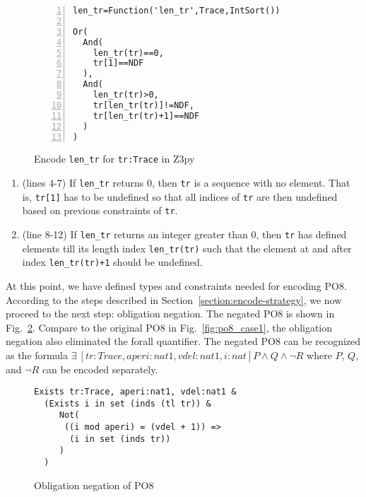 \begin{figure}[t]
\begin{center}
\begin{mdframed}[roundcorner=5pt,shadow=true]
\begin{Verbatim}[fontsize=\small,numbers=left]
len_tr=Function('len_tr',Trace,IntSort())

Or(
  And(
    len_tr(tr)==0,
    tr[1]==NDF
  ),
  And(
    len_tr(tr)>0,
    tr[len_tr(tr)]!=NDF,
    tr[len_tr(tr)+1]==NDF
  )
)
\end{Verbatim}
\end{mdframed}
\vspace{-10pt}
\caption{Encode {\tt len\_tr} for {\tt tr:Trace} in Z3py}
\label{fig:tr_len_case1}
\end{center}
\end{figure}

\begin{enumerate}
\item
(lines 4-7) If {\tt len\_tr} returns 0, then {\tt tr} is a sequence with no element. That is, {\tt tr[1]} has to be undefined so that all indices of {\tt tr} are then undefined based on previous constraints of {\tt tr}. 
\item
(line 8-12) If {\tt len\_tr} returns an integer greater than 0, then {\tt tr} has defined elements till its length index {\tt len\_tr(tr)} such that the element at and after index {\tt len\_tr(tr)+1} should be undefined. 
\end{enumerate}

At this point, we have defined types and constraints needed for encoding PO8. According to the steps described in Section~\ref{section:encode-strategy}, we now proceed to the next step: obligation negation. The negated PO8 is shown in Fig.~\ref{fig:po8_negation_case1}. Compare to the original PO8 in Fig.~\ref{fig:po8_case1}, the obligation negation also eliminated the forall quantifier. The negated PO8 can be recognized as the formula $\exists~[tr:Trace,aperi:nat1,vdel:nat1,i:nat] P \land Q \land \neg R$ where $P$, $Q$, and $\neg R$ can be encoded separately.

\begin{figure}[t]
\begin{center}
\begin{mdframed}[roundcorner=5pt]
\begin{Verbatim}[fontsize=\small]
Exists tr:Trace, aperi:nat1, vdel:nat1 &
  (Exists i in set (inds (tl tr)) &
     Not(
      ((i mod aperi) = (vdel + 1)) =>
       (i in set (inds tr))
     )
  )
\end{Verbatim}
\end{mdframed}
\vspace{-10pt}
\caption{Obligation negation of PO8}
\label{fig:po8_negation_case1}
\end{center}
\vspace{-20pt}
\end{figure}


